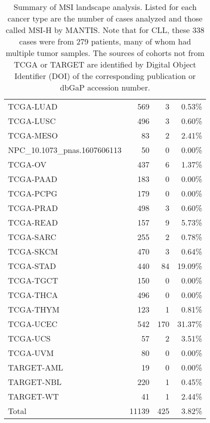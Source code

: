 \begin{table}[htp]
{\begin{tabular}{lrrr}
        TCGA-LUAD & 569   & 3     & 0.53\% \\
        TCGA-LUSC & 496   & 3     & \cellcolor[rgb]{ 1,  .996,  .996}0.60\% \\
        TCGA-MESO & 83    & 2     & \cellcolor[rgb]{ .996,  .984,  .984}2.41\% \\
        NPC\_10.1073\_pnas.1607606113 & 50    & 0     & 0.00\% \\
        TCGA-OV & 437   & 6     & \cellcolor[rgb]{ 1,  .992,  .992}1.37\% \\
        TCGA-PAAD & 183   & 0     & 0.00\% \\
        TCGA-PCPG & 179   & 0     & 0.00\% \\
        TCGA-PRAD & 498   & 3     & \cellcolor[rgb]{ 1,  .996,  .996}0.60\% \\
        TCGA-READ & 157   & 9     & \cellcolor[rgb]{ .988,  .961,  .961}5.73\% \\
        TCGA-SARC & 255   & 2     & \cellcolor[rgb]{ 1,  .996,  .996}0.78\% \\
        TCGA-SKCM & 470   & 3     & \cellcolor[rgb]{ 1,  .996,  .996}0.64\% \\
        TCGA-STAD & 440   & 84    & \cellcolor[rgb]{ .953,  .871,  .871}19.09\% \\
        TCGA-TGCT & 150   & 0     & 0.00\% \\
        TCGA-THCA & 496   & 0     & 0.00\% \\
        TCGA-THYM & 123   & 1     & \cellcolor[rgb]{ 1,  .996,  .996}0.81\% \\
        TCGA-UCEC & 542   & 170   & \cellcolor[rgb]{ .925,  .788,  .784}31.37\% \\
        TCGA-UCS & 57    & 2     & \cellcolor[rgb]{ .992,  .976,  .976}3.51\% \\
        TCGA-UVM & 80    & 0     & 0.00\% \\
        \hline
        TARGET-AML & 19    & 0     & 0.00\% \\
        TARGET-NBL & 220   & 1     & 0.45\% \\
        TARGET-WT & 41    & 1     & \cellcolor[rgb]{ .996,  .984,  .984}2.44\% \\
        \hline
        Total & 11139 & 425   & \cellcolor[rgb]{ .992,  .976,  .976}3.82\%
    \end{tabular}}
    \caption[Summary of MSI landscape analysis.]{Summary of MSI landscape analysis. Listed for each cancer type are the number of cases analyzed and those called MSI-H by MANTIS. Note that for CLL, these 338 cases were from 279 patients, many of whom had multiple tumor samples. The sources of cohorts not from TCGA or TARGET are identified by Digital Object Identifier (DOI) of the corresponding publication or dbGaP accession number.}
    \label{table:msilandscape:landscape_summary}
\end{table}

